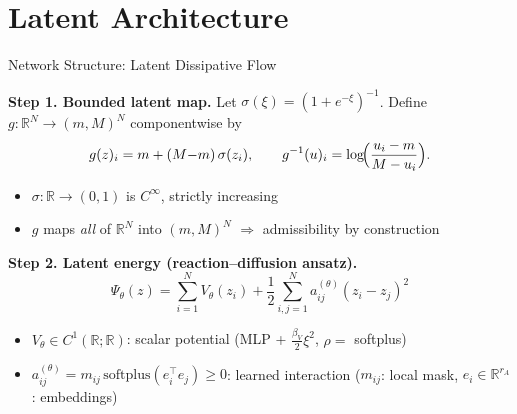 \documentclass[aspectratio=169, 11pt]{beamer}
\newcommand{\R}{\mathbb{R}}
\begin{document}
\section{Latent Architecture}

\begin{frame}{Network Structure: Latent Dissipative Flow}

\small
\textbf{Step 1. Bounded latent map.} Let $\sigma(\xi) = (1+e^{-\xi})^{-1}$.
Define $g:\R^N \to (m,M)^N$ componentwise by
\[
g(z)_i = m + (M{-}m)\,\sigma(z_i), \qquad
g^{-1}(u)_i = \log\!\Bigl(\frac{u_i - m}{M - u_i}\Bigr).
\]
\begin{itemize}
    \item $\sigma: \R \to (0,1)$ is $C^\infty$, strictly increasing
    \item $g$ maps \emph{all} of $\R^N$ into $(m,M)^N$ $\Rightarrow$ \textcolor{green!50!black}{admissibility by construction}
\end{itemize}

\vspace{0.3cm}
\textbf{Step 2. Latent energy (reaction--diffusion ansatz).}
\[
\Psi_\theta(z) = \sum_{i=1}^N V_\theta(z_i) + \frac{1}{2}\sum_{i,j=1}^N a_{ij}^{(\theta)}(z_i - z_j)^2
\]
\begin{itemize}
    \item $V_\theta \in C^1(\R;\R)$: scalar potential (MLP + $\frac{\beta_V}{2}\xi^2$, $\rho=$ softplus)
    \item $a_{ij}^{(\theta)} = m_{ij}\,\mathrm{softplus}(e_i^\top e_j) \geq 0$: learned interaction ($m_{ij}$: local mask, $e_i \in \R^{r_A}$: embeddings)
\end{itemize}
\end{frame}
\end{document}
